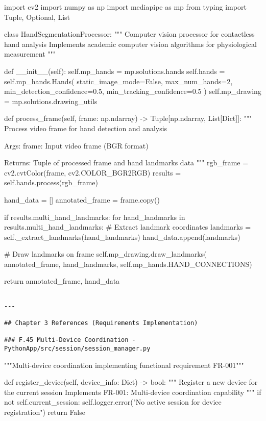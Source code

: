 \documentclass[12pt,a4paper]{report}
\begin{document}
import cv2
import numpy as np
import mediapipe as mp
from typing import Tuple, Optional, List


class HandSegmentationProcessor:
    """
    Computer vision processor for contactless hand analysis
    Implements academic computer vision algorithms for physiological measurement
    """

    def \_\_init\_\_(self):
        self.mp\_hands = mp.solutions.hands
        self.hands = self.mp\_hands.Hands(
            static\_image\_mode=False,
            max\_num\_hands=2,
            min\_detection\_confidence=0.5,
            min\_tracking\_confidence=0.5
        )
        self.mp\_drawing = mp.solutions.drawing\_utils

    def process\_frame(self, frame: np.ndarray) -> Tuple[np.ndarray, List[Dict]]:
        """
        Process video frame for hand detection and analysis
        
        Args:
            frame: Input video frame (BGR format)
            
        Returns:
            Tuple of processed frame and hand landmarks data
        """
        rgb\_frame = cv2.cvtColor(frame, cv2.COLOR\_BGR2RGB)
        results = self.hands.process(rgb\_frame)

        hand\_data = []
        annotated\_frame = frame.copy()

        if results.multi\_hand\_landmarks:
            for hand\_landmarks in results.multi\_hand\_landmarks:
                \# Extract landmark coordinates
                landmarks = self.\_extract\_landmarks(hand\_landmarks)
                hand\_data.append(landmarks)

                \# Draw landmarks on frame
                self.mp\_drawing.draw\_landmarks(
                    annotated\_frame, hand\_landmarks, self.mp\_hands.HAND\_CONNECTIONS)

        return annotated\_frame, hand\_data
\begin{verbatim}

---

## Chapter 3 References (Requirements Implementation)

### F.45 Multi-Device Coordination - PythonApp/src/session/session_manager.py

\end{verbatim}
"""Multi-device coordination implementing functional requirement FR-001"""


def register\_device(self, device\_info: Dict) -> bool:
    """
    Register a new device for the current session
    Implements FR-001: Multi-device coordination capability
    """
    if not self.current\_session:
        self.logger.error("No active session for device registration")
        return False
\end{document}
